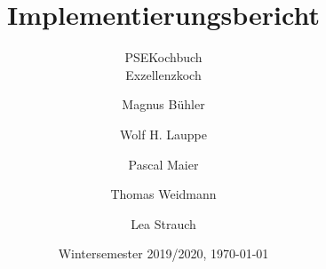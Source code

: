 \documentclass[a4paper,openany,parskip=full]{scrreprt}
\begin{document}
	\title{
		\huge{Implementierungsbericht}
	}
	\subtitle{
		\vspace{1cm}
		\Large {PSEKochbuch}\\
		\LARGE{Exzellenzkoch}
		\vspace{2cm}
	}
	\date{
		\vspace{3cm}
		Wintersemester 2019/2020, \today \\
		\vspace{1cm}
		\vspace{1cm}
	}
	\author{
		Magnus Bühler
		\and Wolf H. Lauppe
		\and Pascal Maier
		\and Thomas Weidmann
		\and Lea Strauch
	}
	\maketitle

\newpage
{}
\tableofcontents
\newpage
{}









\end{document}
